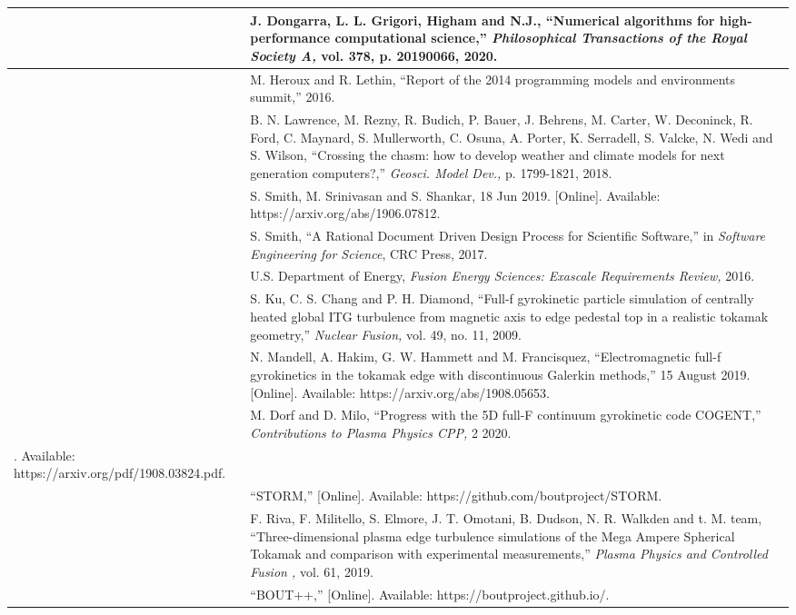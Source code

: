 \documentclass{article}
\begin{document}
\baselineskip=12pt
\begin{tabular}{|>{\raggedright}p{8pt}|>{\raggedright}p{312pt}|}
\hline
[1]  & J. Dongarra, L. L. Grigori, Higham and N.J., ``Numerical algorithms for 
high-performance computational science,'' \textit{Philosophical Transactions of 
the Royal Society A, }vol. 378, p. 20190066, 2020. \tabularnewline
\hline
[2]  & M. Heroux and R. Lethin, ``Report of the 2014 programming models and environments 
summit,'' 2016.\tabularnewline
\hline
[3]  & B. N. Lawrence, M. Rezny, R. Budich, P. Bauer, J. Behrens, M. Carter, W. 
Deconinck, R. Ford, C. Maynard, S. Mullerworth, C. Osuna, A. Porter, K. Serradell, 
S. Valcke, N. Wedi and S. Wilson, ``Crossing the chasm: how to develop weather 
and climate models for next generation computers?,'' \textit{Geosci. Model Dev., 
}p. 1799-1821, 2018. \tabularnewline
\hline
[4]  & S. Smith, M. Srinivasan and S. Shankar, 18 Jun 2019. [Online]. Available: 
https://arxiv.org/abs/1906.07812.\tabularnewline
\hline
[5]  & S. Smith, ``A Rational Document Driven Design Process for Scientific Software,'' 
in \textit{Software Engineering for Science}, CRC Press, 2017. \tabularnewline
\hline
[6]  & U.S. Department of Energy, \textit{Fusion Energy Sciences: Exascale Requirements 
Review, }2016. \tabularnewline
\hline
[7]  & S. Ku, C. S. Chang and P. H. Diamond, ``Full-f gyrokinetic particle simulation 
of centrally heated global ITG turbulence from magnetic axis to edge pedestal top 
in a realistic tokamak geometry,'' \textit{Nuclear Fusion, }vol. 49, no. 11, 2009. 
\tabularnewline
\hline
[8]  & N. Mandell, A. Hakim, G. W. Hammett and M. Francisquez, ``Electromagnetic 
full-f gyrokinetics in the tokamak edge with discontinuous Galerkin methods,'' 
15 August 2019. [Online]. Available: https://arxiv.org/abs/1908.05653.\tabularnewline
\hline
[9]  & M. Dorf and D. Milo, ``Progress with the 5D full-F continuum gyrokinetic 
code COGENT,'' \textit{Contributions to Plasma Physics CPP, }2 2020. \tabularnewline
\hline
[Online]. Available: https://arxiv.org/pdf/1908.03824.pdf.\tabularnewline
\hline
[11]  & ``STORM,'' [Online]. Available: https://github.com/boutproject/STORM.\tabularnewline
\hline
[12]  & F. Riva, F. Militello, S. Elmore, J. T. Omotani, B. Dudson, N. R. Walkden 
and t. M. team, ``Three-dimensional plasma edge turbulence simulations of the Mega 
Ampere Spherical Tokamak and comparison with experimental measurements,'' \textit{Plasma 
Physics and Controlled Fusion , }vol. 61, 2019. \tabularnewline
\hline
[13]  & ``BOUT++,'' [Online]. Available: https://boutproject.github.io/.\tabularnewline

\end{tabular}
\end{document}
